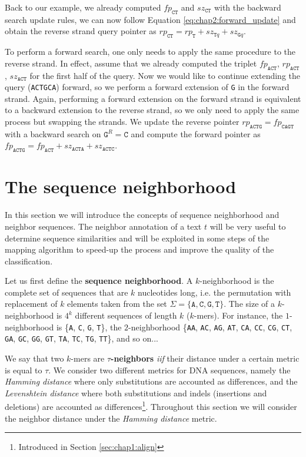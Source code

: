 Back to our example, we already computed $fp_{\texttt{CT}}$ and
$sz_{\texttt{CT}}$ with the backward search update rules, we can now
follow Equation \ref{eq:chap2:forward_update} and obtain the reverse
strand query pointer as $rp_{\texttt{CT}} = rp_{\texttt{T}} +
sz_{\texttt{T}q} + sz_{\texttt{G}q}$.

To perform a forward search, one only needs to apply the same
procedure to the reverse strand. In effect, assume that we already
computed the triplet $fp_{\texttt{ACT}}$, $rp_{\texttt{ACT}}$,
$sz_{\texttt{ACT}}$ for the first half of the query. Now we would like
to continue extending the query (\texttt{ACTGCA}) forward, so we
perform a forward extension of \texttt{G} in the forward
strand. Again, performing a forward extension on the forward strand is
equivalent to a backward extension to the reverse strand, so we only
need to apply the same process but swapping the strands. We update the
reverse pointer $rp_{\texttt{ACTG}} = fp_{\texttt{CAGT}}$ with a backward search on
$\texttt{G}^R = \texttt{C}$ and compute the forward pointer as
$fp_{\texttt{ACTG}}=fp_{\texttt{ACT}}+sz_{\texttt{ACTA}}+sz_{\texttt{ACTC}}$.


\section{The sequence neighborhood}
\label{sec:neighborhood}
In this section we will introduce the concepts of sequence
neighborhood and neighbor sequences. The neighbor annotation of a text
$t$ will be very useful to determine sequence similarities and will
be exploited in some steps of the mapping algorithm to speed-up the
process and improve the quality of the classification.

Let us first define the {\bf sequence neighborhood}. A $k$-neighborhood is
the complete set of sequences that are $k$ nucleotides long, i.e. the
permutation with replacement of $k$ elements taken from the set
$\Sigma=\{\texttt{A},\texttt{C},\texttt{G},\texttt{T}\}$. The size of
a $k$-neighborhood is $4^k$ different sequences of length $k$
($k$-mers). For instance, the $1$-neighborhood is
\{\texttt{A}, \texttt{C}, \texttt{G}, \texttt{T}\}, the
$2$-neighborhood
\{\texttt{AA}, \texttt{AC}, \texttt{AG}, \texttt{AT}, \texttt{CA},
\texttt{CC}, \texttt{CG}, \texttt{CT}, \texttt{GA}, \texttt{GC},
\texttt{GG}, \texttt{GT}, \texttt{TA}, \texttt{TC}, \texttt{TG},
\texttt{TT}\}, and so on...

We say that two $k$-mers are {\bf$\tau$-neighbors} {\em iif} their
distance under a certain metric is equal to $\tau$. We consider two
different metrics for DNA sequences, namely the {\em Hamming distance}
where only substitutions are accounted as differences, and the {\em
  Levenshtein distance} where both substitutions and indels
(insertions and deletions) are accounted as
differences\footnote{Introduced in Section
  \ref{sec:chap1:align}}. Throughout this section we will consider the
neighbor distance under the {\em Hamming distance} metric.

